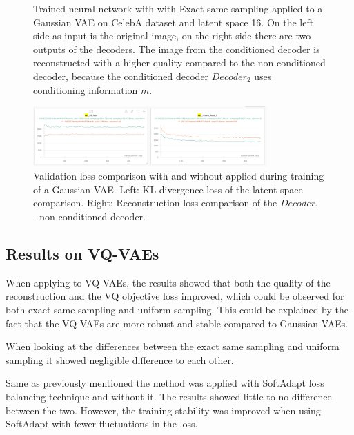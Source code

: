 \begin{figure}[H]
    \centering
    
    \caption[Trained neural network with  applied to a Gaussian VAE.]
    { 
        Trained neural network with  with Exact same sampling applied to a Gaussian VAE on CelebA dataset and latent space 16. 
        On the left side as input is the original image, on the right side there are two outputs of the decoders. 
        The image from the conditioned decoder is reconstructed with a higher quality compared to the non-conditioned decoder, because the conditioned decoder $Decoder_2$ uses conditioning information $m$.
    }
    \label{fig:res_val}
\end{figure}


\begin{figure}[H]
    \centering
    \includegraphics[width=0.8\textwidth]{figures/results/KL_and_RECON.png}
    \caption[Validation loss comparison during training of a Gaussian VAE.]
    {
        Validation loss comparison with and without  applied during training of a Gaussian VAE.
        Left: KL divergence loss of the latent space comparison. Right: Reconstruction loss comparison of the $Decoder_1$ - non-conditioned decoder.
    }
    \label{fig:results_method1_gaussian_vae}
\end{figure}

\subsection{Results on VQ-VAEs}

When applying  to VQ-VAEs, the results showed that both the quality of the reconstruction and the VQ objective loss improved, which could be observed for both exact same sampling and uniform sampling. This could be explained by the fact that the VQ-VAEs are more robust and stable compared to Gaussian VAEs.

When looking at the differences between the exact same sampling and uniform sampling it showed negligible difference to each other. 

Same as previously mentioned the method was applied with SoftAdapt loss balancing technique and without it. The results showed little to no difference between the two. However, the training stability was improved when using SoftAdapt with fewer fluctuations in the loss.

